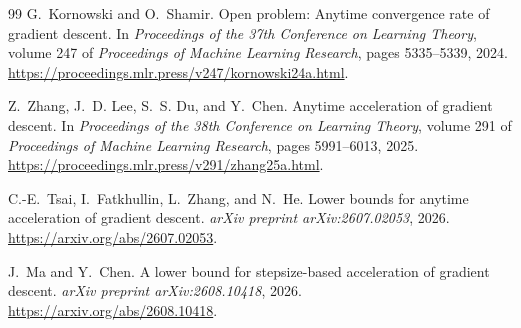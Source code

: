 \documentclass[11pt]{article}
\theoremstyle{definition}
\theoremstyle{remark}
\begin{document}
\begin{thebibliography}{99}
G.~Kornowski and O.~Shamir.
\newblock Open problem: Anytime convergence rate of gradient descent.
\newblock In \emph{Proceedings of the 37th Conference on Learning Theory},
volume 247 of \emph{Proceedings of Machine Learning Research}, pages
5335--5339, 2024.
\newblock \url{https://proceedings.mlr.press/v247/kornowski24a.html}.

Z.~Zhang, J.~D. Lee, S.~S. Du, and Y.~Chen.
\newblock Anytime acceleration of gradient descent.
\newblock In \emph{Proceedings of the 38th Conference on Learning Theory},
volume 291 of \emph{Proceedings of Machine Learning Research}, pages
5991--6013, 2025.
\newblock \url{https://proceedings.mlr.press/v291/zhang25a.html}.

C.-E.~Tsai, I.~Fatkhullin, L.~Zhang, and N.~He.
\newblock Lower bounds for anytime acceleration of gradient descent.
\newblock \emph{arXiv preprint arXiv:2607.02053}, 2026.
\newblock \url{https://arxiv.org/abs/2607.02053}.

J.~Ma and Y.~Chen.
\newblock A lower bound for stepsize-based acceleration of gradient descent.
\newblock \emph{arXiv preprint arXiv:2608.10418}, 2026.
\newblock \url{https://arxiv.org/abs/2608.10418}.

\end{thebibliography}
\end{document}
